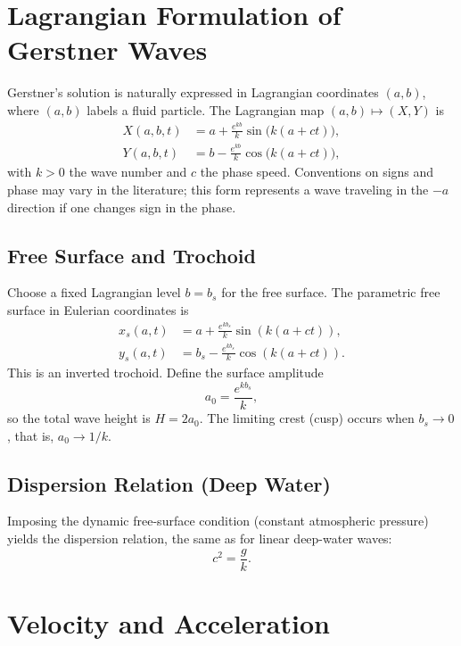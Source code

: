 \documentclass[journal,10pt,twocolumn]{IEEEtran}
\begin{document}
\section{Lagrangian Formulation of Gerstner Waves}

Gerstner's solution is naturally expressed in Lagrangian coordinates $(a,b)$, where $(a,b)$ labels a fluid particle. The Lagrangian map $(a,b)\mapsto (X,Y)$ is
\begin{align}
    X(a,b,t) &= a + \frac{e^{k b}}{k}\sin\big(k(a+ct)\big), \label{eq:gerstnerX}\\
    Y(a,b,t) &= b - \frac{e^{k b}}{k}\cos\big(k(a+ct)\big), \label{eq:gerstnerY}
\end{align}
with $k>0$ the wave number and $c$ the phase speed. Conventions on signs and phase may vary in the literature; this form represents a wave traveling in the $-a$ direction if one changes sign in the phase.

\subsection{Free Surface and Trochoid}

Choose a fixed Lagrangian level $b=b_s$ for the free surface. The parametric free surface in Eulerian coordinates is
\begin{align}
    x_s(a,t) &= a + \frac{e^{k b_s}}{k}\sin(k(a+ct)), \\
    y_s(a,t) &= b_s - \frac{e^{k b_s}}{k}\cos(k(a+ct)).
\end{align}
This is an inverted trochoid. Define the surface amplitude
\[
    a_0 = \frac{e^{k b_s}}{k},
\]
so the total wave height is $H=2a_0$. The limiting crest (cusp) occurs when $b_s\to 0$, that is, $a_0\to 1/k$.

\subsection{Dispersion Relation (Deep Water)}

Imposing the dynamic free-surface condition (constant atmospheric pressure) yields the dispersion relation, the same as for linear deep-water waves:
\begin{equation}
    c^2 = \frac{g}{k}. \label{eq:dispersion}
\end{equation}

\section{Velocity and Acceleration}
\end{document}
